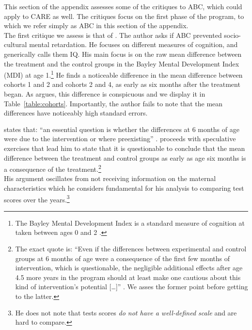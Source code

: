 \begin{appendices}
\noindent This section of the appendix assesses some of the critiques to ABC, which could apply to CARE as well. The critiques focus on the first phase of the program, to which we refer simply as ABC in this section of the appendix.\\

\noindent The first critique we assess is that of \citet{Spitz_1992_ABC-Retardation}. The author asks if ABC prevented socio-cultural mental retardation. He focuses on different measures of cognition, and generically calls them IQ. His main focus is on the raw mean difference between the treatment and the control groups in the Bayley Mental Development Index (MDI) at age 1.\footnote{The Bayley Mental Development Index is a standard measure of cognition at taken between ages 0 and 2 \citep{Childrens-Health_2016_Bayley-Scales}.} He finds a noticeable difference in the mean difference between cohorts 1 and 2 and cohorts 2 and 4, as early as six months after the treatment began. As \citet{Spitz_1992_ABC-Retardation} argues, this difference is conspicuous and we display it in Table~\ref{table:cohorts}. Importantly, the author fails to note that the mean differences have noticeably high standard errors.



\noindent \citet{Spitz_1992_ABC-Retardation} states that: ``an essential question is whether the differences at 6 months of age were due to the intervention or where preexisting'' \citep[][p. 230]{Spitz_1992_ABC-Retardation}. \citet{Spitz_1992_ABC-Retardation} proceeds with speculative exercises that lead him to state that it is questionable to conclude that the mean difference between the treatment and control groups as early as age six months is a consequence of the treatment.\footnote{The exact quote is: ``Even if the differences between experimental and control groups at 6 months of age were a consequence of the first few months of intervention, which is questionable, the negligible additional effects after age 4.5 more years in the program should at least make one cautious about this kind of intervention's potential [\ldots]'' \citep[][p. 235]{Spitz_1992_ABC-Retardation}. We asses the former point before getting to the latter.}\\

\noindent His argument oscillates from not receiving information on the maternal characteristics which he considers fundamental for his analysis to comparing test scores over the years.\footnote{He does not note that tests scores \textit{do not have a well-defined scale} and are hard to compare.}\\ 


\end{appendices}
